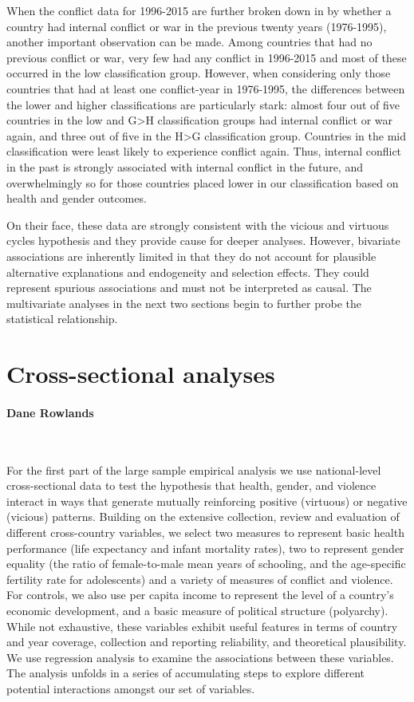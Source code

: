 \documentclass[12pt]{article}
\begin{document}
When the conflict data for 1996-2015 are further broken down in  by whether a country had internal conflict or war in the previous twenty years (1976-1995), another important observation can be made.
Among countries that had no previous conflict or war, very few had any conflict in 1996-2015 and most of these occurred in the low classification group.
However, when considering only those countries that had at least one conflict-year in 1976-1995, the differences between the lower and higher classifications are particularly stark: almost four out of five countries in the low and G>H classification groups had internal conflict or war again, and three out of five in the H>G classification group. Countries in the mid classification were least likely to experience conflict again.
Thus, internal conflict in the past is strongly associated with internal conflict in the future, and overwhelmingly so for those countries placed lower in our classification based on health and gender outcomes.

On their face, these data are strongly consistent with the vicious and virtuous cycles hypothesis and they provide cause for deeper analyses. However, bivariate associations are inherently limited in that they do not account for plausible alternative explanations and endogeneity and selection effects.
They could represent spurious associations and must not be interpreted as causal.
The multivariate analyses in the next two sections begin to further probe the statistical relationship.

\section{Cross-sectional analyses}
\label{cross-sectional}
\paragraph{Dane Rowlands}\ \bigskip

For the first part of the large sample empirical analysis we use national-level cross-sectional data to test the hypothesis that health, gender, and violence interact in ways that generate mutually reinforcing positive (virtuous) or negative (vicious) patterns. Building on the extensive collection, review and evaluation of different cross-country variables, we select two measures to represent basic health performance (life expectancy and infant mortality rates), two to represent gender equality (the ratio of female-to-male mean years of schooling, and the age-specific fertility rate for adolescents) and a variety of measures of conflict and violence. For controls, we also use per capita income to represent the level of a country’s economic development, and a basic measure of political structure (polyarchy). While not exhaustive, these variables exhibit useful features in terms of country and year coverage, collection and reporting reliability, and theoretical plausibility. We use regression analysis to examine the associations between these variables. The analysis unfolds in a series of accumulating steps to explore different potential interactions amongst our set of variables.
\end{document}

